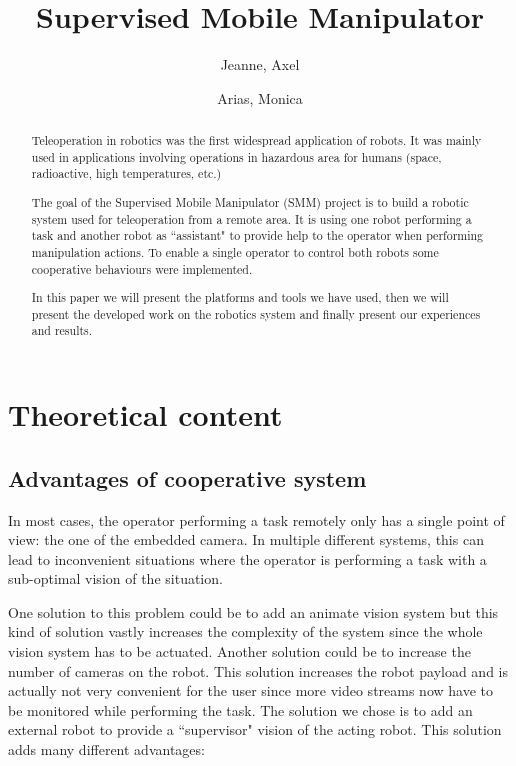 \documentclass[11pt,a4paper]{article}
\begin{document}
\pagestyle{plain}
\author{Jeanne, Axel \and Arias, Monica}
\title{Supervised Mobile Manipulator}
\maketitle
\begin{abstract}
Teleoperation in robotics was the first widespread application of robots. 
It was mainly used in applications involving operations in hazardous area for humans (space, 
radioactive, high temperatures, etc.)

The goal of the Supervised Mobile Manipulator (SMM) project is to build a robotic system used for
teleoperation from a remote area. It is using one robot performing a task and another robot as 
``assistant" to provide help to the operator when performing manipulation actions. To enable a single operator to control both robots some cooperative behaviours were implemented.

In this paper we will present the platforms and tools we have used, then we will present the developed 
work on the robotics system and finally present our experiences and results.
\end{abstract}
\clearpage

\tableofcontents

\clearpage
\section{Theoretical content}
\subsection{Advantages of cooperative system}
In most cases, the operator performing a task remotely only has a single point of view: the
one of the embedded camera. In multiple different systems, this can
lead to inconvenient situations where the operator is performing a task with a sub-optimal
vision of the situation.

One solution to this problem could be to add an animate vision system \cite{Ballard1991}
but this kind of solution vastly increases the complexity of the system since the whole vision system
has to be actuated. Another solution could be to increase the number of cameras on the robot.
This solution increases the robot payload and is actually not very convenient for the user
since more video streams now have to be monitored while performing the task. The solution we chose is to add an external robot to provide a ``supervisor" vision of the acting robot. This solution adds many different  advantages:
\end{document}
